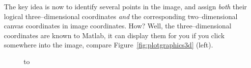{{{}%

The key idea is now to identify several points in the image, and assign \emph{both} their logical three--dimensional coordinates \emph{and} the corresponding two--dimensional canvas coordinates in image coordinates. How? Well, the three--dimensional coordinates are known to Matlab, it can display them for you if you click somewhere into the image, compare Figure~\ref{fig:plotgraphics3d} (left).

\begin{figure}
\noindent
\hbox to %



\end{figure}}}
